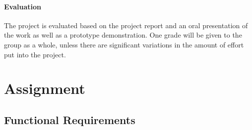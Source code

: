 \paragraph{Evaluation}
The project is evaluated based on the project report and an oral presentation of
the work as well as a prototype demonstration. One grade will be given to the
group as a whole, unless there are significant variations in the amount of
effort put into the project.

\section{Assignment}


\subsection{Functional Requirements}

